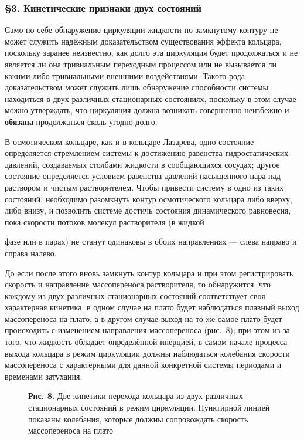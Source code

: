 \documentclass[12pt,a4paper]{article}
\begin{document}
\subsubsection*{§3. Кинетические признаки двух состояний}

Само по себе обнаружение циркуляции жидкости по замкнутому контуру не может
служить надёжным доказательством существования эффекта кольцара, поскольку
заранее неизвестно, как долго эта циркуляция будет продолжаться и не является
ли она тривиальным переходным процессом или не вызывается ли какими-либо
тривиальными внешними воздействиями. Такого рода доказательством может служить
лишь обнаружение способности системы находиться в двух различных стационарных
состояниях, поскольку в этом случае можно утверждать, что циркуляция должна
возникать совершенно неизбежно и \textbf{обязана} продолжаться сколь угодно
долго.

В осмотическом кольцаре, как и в кольцаре Лазарева, одно состояние
определяется стремлением системы к достижению равенства гидростатических
давлений, создаваемых столбами жидкости в сообщающихся сосудах; другое
состояние определяется условием равенства давлений насыщенного пара над
раствором и чистым растворителем. Чтобы привести систему в одно из таких
состояний, необходимо разомкнуть контур осмотического кольцара либо вверху,
либо внизу, и позволить системе достичь состояния динамического равновесия,
пока скорости потоков молекул растворителя (в жидкой

фазе или в парах) не станут одинаковы в обоих направлениях — слева направо и
справа налево.

До если после этого вновь замкнуть контур кольцара и при этом регистрировать
скорость и направление массопереноса растворителя, то обнаружится, что каждому
из двух различных стационарных состояний соответствует своя характерная
кинетика: в одном случае на плато будет наблюдаться плавный выход массопереноса
на плато, а в другом случае выход на то же самое плато будет происходить с
изменением направления массопереноса (рис.~8); при этом из-за того, что
жидкость обладает определённой инерцией, в самом начале процесса выхода
кольцара в режим циркуляции должны наблюдаться колебания скорости
массопереноса с характерными для данной конкретной системы периодами и
временами затухания.

\begin{figure}[h]
\centering
\caption*{\textbf{Рис. 8.} Две кинетики перехода кольцара из двух различных
стационарных состояний в режим циркуляции. Пунктирной линией показаны
колебания, которые должны сопровождать скорость массопереноса на плато}
\end{figure}
\end{document}
